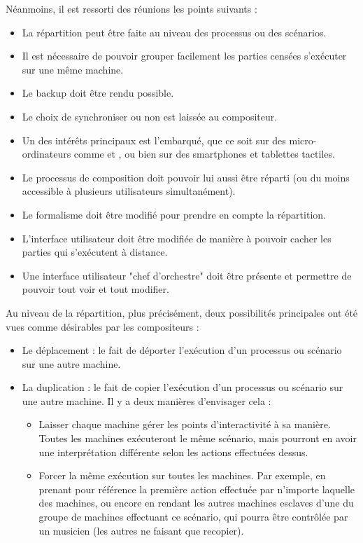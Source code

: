 Néanmoins, il est ressorti des réunions les points suivants : 
\begin{itemize}
	\item La répartition peut être faite au niveau des processus ou des scénarios.
	\item Il est nécessaire de pouvoir grouper facilement les parties censées s'exécuter sur une même machine.
	\item Le backup doit être rendu possible.
	\item Le choix de synchroniser ou non est laissée au compositeur.
	\item Un des intérêts principaux est l'embarqué, que ce soit sur des micro-ordinateurs comme  et , ou bien sur des smartphones et tablettes tactiles.
	\item Le processus de composition doit pouvoir lui aussi être réparti (ou du moins accessible à plusieurs utilisateurs simultanément).
	\item Le formalisme doit être modifié pour prendre en compte la répartition.
	\item L'interface utilisateur doit être modifiée de manière à pouvoir cacher les parties qui s'exécutent à distance.
	\item Une interface utilisateur "chef d'orchestre" doit être présente et permettre de pouvoir tout voir et tout modifier.
\end{itemize}

Au niveau de la répartition, plus précisément, deux possibilités principales ont été vues comme désirables par les compositeurs : 
\begin{itemize}
	\item Le déplacement : le fait de déporter l'exécution d'un processus ou scénario sur une autre machine.
	\item La duplication : le fait de copier l'exécution d'un processus ou scénario sur une autre machine.
	Il y a deux manières d'envisager cela : 
	\begin{itemize}
		\item Laisser chaque machine gérer les points d'interactivité à sa manière. Toutes les machines exécuteront le même scénario, mais pourront en avoir une interprétation différente selon les actions effectuées dessus.
		\item Forcer la même exécution sur toutes les machines. Par exemple, en prenant pour référence la première action effectuée par n'importe laquelle des machines, ou encore en rendant les autres machines esclaves d'une du groupe de machines effectuant ce scénario, qui pourra être contrôlée par un musicien (les autres ne faisant que recopier).
	\end{itemize}
\end{itemize}

